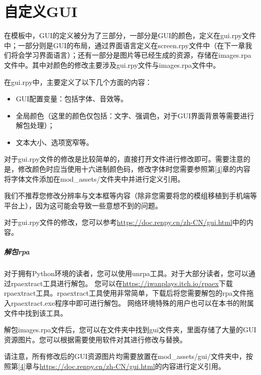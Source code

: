 \documentclass[../../Main.tex]{subfiles}
\begin{document}
\section{自定义GUI}
\label{sec:8.1}
在模板中，GUI的定义被分为了三部分，一部分是GUI的颜色，定义在gui.rpy文件中；一部分则是GUI的布局，通过界面语言定义在screen.rpy文件中（在下一章我们将会学习界面语言）；还有一部分是图片等已经生成的资源，存储在images.rpa文件中。其中对颜色的修改主要涉及gui.rpy文件与images.rpa文件中。

在gui.rpy中，主要定义了以下几个方面的内容：
\begin{itemize}
    \item GUI配置变量：包括字体、音效等。
    \item 全局颜色（这里的颜色仅包括：文字、强调色，对于GUI界面背景等需要进行解包处理）；
    \item 文本大小、选项宽窄等。
\end{itemize}

对于gui.rpy文件的修改是比较简单的，直接打开文件进行修改即可。需要注意的是，修改颜色时应当使用十六进制颜色码，修改字体时您需要参照第\ref{4}章的内容将字体文件添加在mod\_assets/文件夹中并进行定义引用。

\begin{Warning}
    我们不推荐您修改分辨率与文本框等内容（除非您需要将您的模组移植到手机端等平台上），因为这可能会导致一些意想不到的问题。
\end{Warning}

对于gui.rpy文件的修改，您可以参考\url{https://doc.renpy.cn/zh-CN/gui.html}中的内容。

\subparagraph{解包rpa}
对于拥有Python环境的读者，您可以使用unrpa工具。对于大部分读者，您可以通过rpaextract工具进行解包。
您可以在\url{https://iwanplays.itch.io/rpaex}下载rpaextract工具。rpaextract工具使用非常简单，下载后将您需要解包的rpa文件拖入rpaextract.exe程序中即可进行解包。
网络环境特殊的用户也可以在本书的附属文件中找到该工具。

解包images.rpa文件后，您可以在文件夹中找到gui文件夹，里面存储了大量的GUI资源图片。您可以根据需要使用软件对其进行修改与替换。

请注意，所有修改后的GUI资源图片均需要放置在mod\_assets/gui/文件夹中，按照第\ref{4}章与\url{https://doc.renpy.cn/zh-CN/gui.html}的内容进行定义引用。
\end{document}
